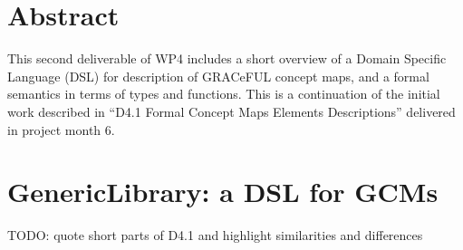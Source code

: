 \documentclass[]{article}
\begin{document}
\vfill

\tableofcontents

\vfill

\newpage

\section*{Abstract}\label{abstract}

This second deliverable of WP4 includes a short overview of a Domain
Specific Language (DSL) for description of GRACeFUL concept maps, and
a formal semantics in terms of types and functions. This is a
continuation of the initial work described in ``D4.1 Formal Concept
Maps Elements Descriptions'' delivered in project month 6. 





\section{GenericLibrary: a DSL for GCMs}
\label{sec:gl}


TODO: quote short parts of D4.1 and highlight similarities and differences

\end{document}
